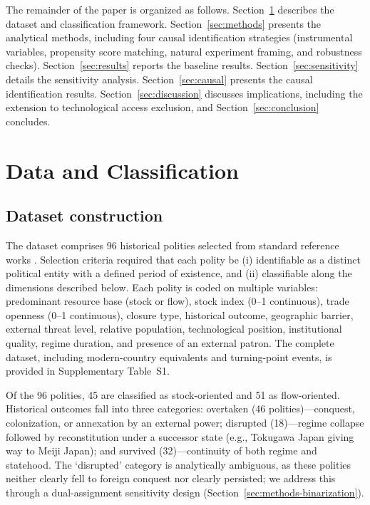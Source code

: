\documentclass[pdflatex,sn-basic]{sn-jnl}
\theoremstyle{thmstyleone}%
\theoremstyle{thmstyletwo}%
\theoremstyle{thmstylethree}%
\begin{document}
The remainder of the paper is organized as follows. Section~\ref{sec:data} describes the dataset and classification framework. Section~\ref{sec:methods} presents the analytical methods, including four causal identification strategies (instrumental variables, propensity score matching, natural experiment framing, and robustness checks). Section~\ref{sec:results} reports the baseline results. Section~\ref{sec:sensitivity} details the sensitivity analysis. Section~\ref{sec:causal} presents the causal identification results. Section~\ref{sec:discussion} discusses implications, including the extension to technological access exclusion, and Section~\ref{sec:conclusion} concludes.

\section{Data and Classification}\label{sec:data}

\subsection{Dataset construction}\label{sec:data-construction}

The dataset comprises 96 historical polities selected from standard reference works \citep{FindlayORourke2007, Kennedy1987, Turchin2009}. Selection criteria required that each polity be (i) identifiable as a distinct political entity with a defined period of existence, and (ii) classifiable along the dimensions described below. Each polity is coded on multiple variables: predominant resource base (stock or flow), stock index (0--1 continuous), trade openness (0--1 continuous), closure type, historical outcome, geographic barrier, external threat level, relative population, technological position, institutional quality, regime duration, and presence of an external patron. The complete dataset, including modern-country equivalents and turning-point events, is provided in Supplementary Table~S1.

Of the 96 polities, 45 are classified as stock-oriented and 51 as flow-oriented. Historical outcomes fall into three categories: overtaken (46 polities)---conquest, colonization, or annexation by an external power; disrupted (18)---regime collapse followed by reconstitution under a successor state (e.g., Tokugawa Japan giving way to Meiji Japan); and survived (32)---continuity of both regime and statehood. The `disrupted' category is analytically ambiguous, as these polities neither clearly fell to foreign conquest nor clearly persisted; we address this through a dual-assignment sensitivity design (Section~\ref{sec:methods-binarization}).
\end{document}
